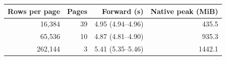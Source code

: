 \begin{tabular}{rrrr}
\toprule
Rows per page & Pages & Forward (s) & Native peak (MiB) \\
\midrule
16,384 & 39 & 4.95 (4.94--4.96) & 435.5 \\
65,536 & 10 & 4.87 (4.81--4.90) & 935.3 \\
262,144 & 3 & 5.41 (5.35--5.46) & 1442.1 \\
\bottomrule
\end{tabular}
